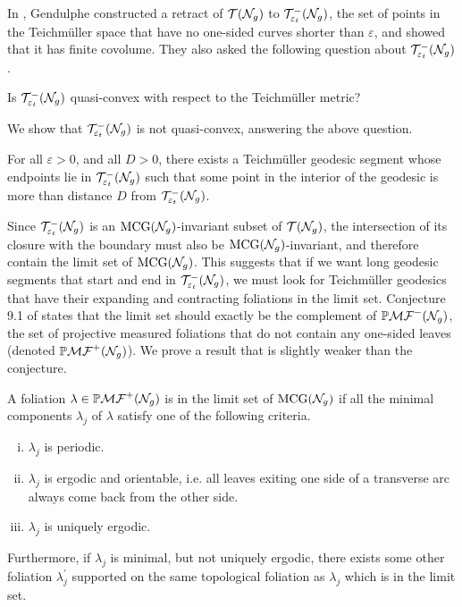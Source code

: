 In \cite{gendulphe2017whats}, Gendulphe constructed a retract of $\mathcal{T}(\mathcal{N}_g)$ to $\mathcal{T}_{\varepsilon_t}^{-}(\mathcal{N}_g)$, the set of points in the Teichm\"uller space that have no one-sided curves shorter than $\varepsilon$, and showed that it has finite covolume.
They also asked the following question about $\mathcal{T}_{\varepsilon_t}^{-}(\mathcal{N}_g)$.
\begin{unquestion}
  Is $\mathcal{T}_{\varepsilon_t}^{-}(\mathcal{N}_g)$ quasi-convex with respect to the Teichmüller metric?
\end{unquestion}
We show that ${\mathcal{T}_{\varepsilon_t}^{-}(\mathcal{N}_g)}$ is not quasi-convex, answering the above question.
\begingroup
\def\thetheorem{\ref{thm:qc-fail}}
\begin{theorem}
  For all $\varepsilon > 0$, and all $D > 0$, there exists a Teichm\"uller geodesic segment whose endpoints lie in ${\mathcal{T}_{\varepsilon_t}^{-}(\mathcal{N}_g)}$ such that some point in the interior of the geodesic is more than distance $D$ from $\mathcal{T}_{\varepsilon_t}^{-}(\mathcal{N}_g)$.
\end{theorem}
\addtocounter{theorem}{-1}
\endgroup

Since $\mathcal{T}_{\varepsilon_t}^{-}(\mathcal{N}_g)$ is an $\mathrm{MCG}(\mathcal{N}_g)$-invariant subset of $\mathcal{T}(\mathcal{N}_g)$, the intersection of its closure with the boundary must also be $\mathrm{MCG}(\mathcal{N}_g)$-invariant, and therefore contain the limit set of $\mathrm{MCG}(\mathcal{N}_g)$.
This suggests that if we want long geodesic segments that start and end in $\mathcal{T}_{\varepsilon_t}^{-}(\mathcal{N}_g)$, we must look for Teichmüller geodesics that have their expanding and contracting foliations in the limit set.
Conjecture 9.1 of \cite{gendulphe2017whats} states that the limit set should exactly be the complement of $\mathbb{P}\mathcal{MF}^-(\mathcal{N}_g)$, the set of projective measured foliations that do not contain any one-sided leaves (denoted $\mathbb{P}\mathcal{MF}^+(\mathcal{N}_g)$).
We prove a result that is slightly weaker than the conjecture.
\begingroup
\def\thetheorem{\ref{thm:rational-approximation}}
\begin{theorem}
  A foliation $\lambda \in \mathbb{P}\mathcal{MF}^+(\mathcal{N}_g)$ is in the limit set of $\mathrm{MCG}(\mathcal{N}_g)$ if all the minimal components $\lambda_j$ of $\lambda$ satisfy one of the following criteria.
  \begin{enumerate}[(i)]
  \item $\lambda_j$ is periodic.
  \item $\lambda_j$ is ergodic and orientable, i.e. all leaves exiting one side of a transverse arc always come back from the other side.
  \item $\lambda_j$ is uniquely ergodic.
  \end{enumerate}
  Furthermore, if $\lambda_j$ is minimal, but not uniquely ergodic, there exists some other foliation $\lambda_j^{\prime}$ supported on the same topological foliation as $\lambda_j$ which is in the limit set.
\end{theorem}
\addtocounter{theorem}{-1}
\endgroup

